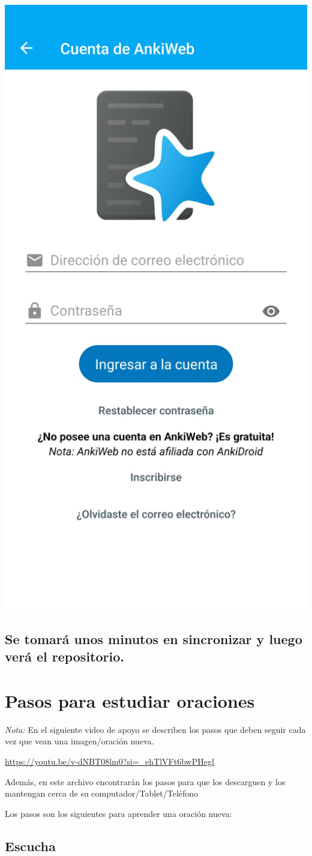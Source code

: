 \documentclass[
]{book}
\begin{document}
\includegraphics[width=0.5\linewidth]{images/reposit_sp/cuenta_anki2}

\hypertarget{se-tomaruxe1-unos-minutos-en-sincronizar-y-luego-veruxe1-el-repositorio.}{%
\section{Se tomará unos minutos en sincronizar y luego verá el repositorio.}\label{se-tomaruxe1-unos-minutos-en-sincronizar-y-luego-veruxe1-el-repositorio.}}

\hypertarget{cross_4}{%
\chapter{Pasos para estudiar oraciones}\label{cross_4}}

\emph{Nota:} En el siguiente video de apoyo se describen los pasos que deben seguir cada vez que vean una imagen/oración nueva.

\url{https://youtu.be/v-dNBT08lm0?si=_ehTlVFt6bwPHegl}

Además, en este archivo encontrarán los pasos para que los descarguen y los mantengan cerca de su computador/Tablet/Teléfono

Los pasos son los siguientes para aprender una oración nueva:

\hypertarget{cross_2}{%
\section{Escucha}\label{cross_2}}
\end{document}
